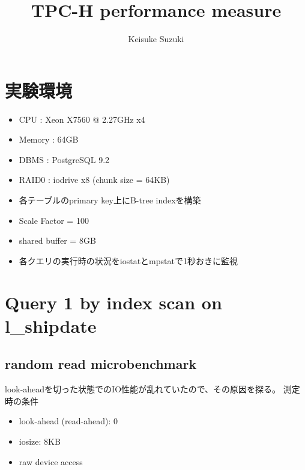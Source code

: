 \documentclass[11pt,a4paper]{jsarticle}
\title{TPC-H performance measure}
\author{Keisuke Suzuki}
\begin{document}
\maketitle
\section{実験環境}
\begin{itemize}
 \item CPU : Xeon X7560 @ 2.27GHz x4
 \item Memory : 64GB
 \item DBMS : PostgreSQL 9.2
 \item RAID0 : iodrive x8 (chunk size = 64KB)
 \item 各テーブルのprimary key上にB-tree indexを構築
 \item Scale Factor = 100
 \item shared buffer = 8GB
 \item 各クエリの実行時の状況をiostatとmpstatで1秒おきに監視
\end{itemize}

\clearpage
\section{Query 1 by index scan on l\_shipdate}
\subsection{random read microbenchmark}
look-aheadを切った状態でのIO性能が乱れていたので、その原因を探る。
測定時の条件
\begin{itemize}
 \item look-ahead (read-ahead): 0
 \item iosize: 8KB
 \item raw device access
\end{itemize}
\end{document}
